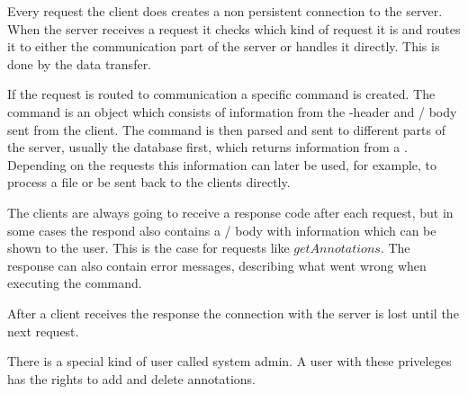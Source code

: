 Every request the client does creates a non persistent connection to
the server. When the server receives a request it checks which kind of
request it is and routes it to either the communication part of the
server or handles it directly. This is done by the data transfer.

If the request is routed to communication a specific command is
created. The command is an object which consists of information from
the -header and \json/ body sent from the
client. The command is then parsed and sent to different parts of the
server, usually the database first, which returns information from a
. Depending on the requests this information can later
be used, for example, to process a file or be sent back to the clients
directly.

The clients are always going to receive a response code after each
request, but in some cases the respond also contains a \json/
body with information which can be shown to the user. This is the case
for requests like $getAnnotations$. The response can also contain
error messages, describing what went wrong when executing the command.

After a client receives the response the connection with the server is
lost until the next request.

There is a special kind of user called system admin. A user with these
priveleges has the rights to add and delete annotations.
